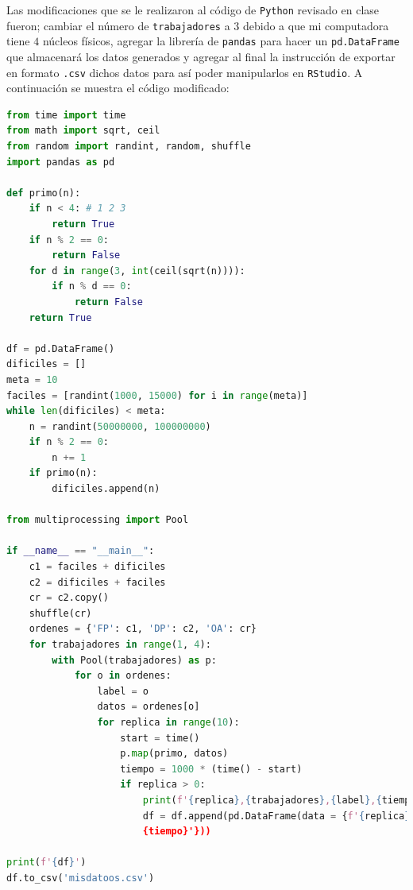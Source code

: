 \documentclass{article}
\begin{document}
Las modificaciones que se le realizaron al código de \texttt{Python} revisado en clase fueron; cambiar el número de \texttt{trabajadores} a $3$ debido a que mi computadora tiene $4$ núcleos físicos, agregar la librería de \texttt{pandas} para hacer un \texttt{pd.DataFrame} que almacenará los datos generados y agregar al final la instrucción de exportar en formato \texttt{.csv} dichos datos para así poder manipularlos en \texttt{RStudio}. A continuación se muestra el código modificado:


\lstset{style=mystyle}
\begin{lstlisting}[language=Python, caption= Código para exportar datos en formato \texttt{.csv}.]
from time import time
from math import sqrt, ceil
from random import randint, random, shuffle
import pandas as pd

def primo(n):
    if n < 4: # 1 2 3
        return True
    if n % 2 == 0:
        return False
    for d in range(3, int(ceil(sqrt(n)))):
        if n % d == 0:
            return False
    return True

df = pd.DataFrame()
dificiles = []
meta = 10
faciles = [randint(1000, 15000) for i in range(meta)]
while len(dificiles) < meta:
    n = randint(50000000, 100000000) 
    if n % 2 == 0:
        n += 1
    if primo(n):
        dificiles.append(n)

from multiprocessing import Pool

if __name__ == "__main__":
    c1 = faciles + dificiles
    c2 = dificiles + faciles
    cr = c2.copy()
    shuffle(cr)
    ordenes = {'FP': c1, 'DP': c2, 'OA': cr}
    for trabajadores in range(1, 4):
        with Pool(trabajadores) as p:
            for o in ordenes:
                label = o
                datos = ordenes[o]
                for replica in range(10):
                    start = time()
                    p.map(primo, datos)
                    tiempo = 1000 * (time() - start)
                    if replica > 0:
                        print(f'{replica},{trabajadores},{label},{tiempo}')
                        df = df.append(pd.DataFrame(data = {f'{replica},{trabajadores},{label},
                        {tiempo}'}))

print(f'{df}')
df.to_csv('misdatoos.csv')

\end{lstlisting}
\end{document}
